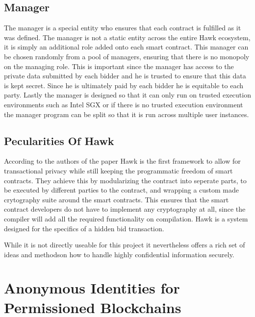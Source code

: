 \subsection{Manager}
The manager is a special entity who ensures that each contract is fulfilled as it was defined. The manager is not a static entity across the entire Hawk ecosystem, it is simply an additional role added onto each smart contract. This manager can be chosen randomly from a pool of managers, ensuring that there is no monopoly on the managing role. This is important since the manager has access to the private data submitted by each bidder and he is trusted to ensure that this data is kept secret. Since he is ultimately paid by each bidder he is equitable to each party. Lastly the manager is designed so that it can only run on trusted execution environments such as Intel SGX or if there is no trusted execution environment the manager program can be split so that it is run across multiple user instances.

\subsection{Pecularities Of Hawk}
According to the authors of the paper Hawk is the first framework to allow for transactional privacy while still keeping the programmatic freedom of smart contracts. They achieve this by modularizing the contract into seperate parts, to be executed by different parties to the contract, and wrapping a custom made crytography suite around the smart contracts. This ensures that the smart contract developers do not have to implement any cryptography at all, since the compiler will add all the required functionality on compilation. Hawk is a system designed for the specifics of a hidden bid transaction.

While it is not directly useable for this project it nevertheless offers a rich set of ideas and methodson how to handle highly confidential information securely.

\section{Anonymous Identities for Permissioned Blockchains}

